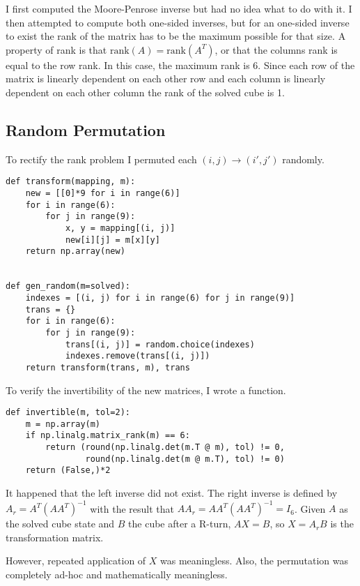 \documentclass[11pt, oneside]{article}
\begin{document}
I first computed the Moore-Penrose inverse but had no idea what to do with it.
I then attempted to compute both one-sided inverses, but for an one-sided inverse to exist the rank of the matrix has to be the maximum possible for that size.
A property of rank is that \( \text{rank}(A) = \text{rank}(A^T) \), or that the columns rank is equal to the row rank. In this case, the maximum rank is 6.
Since each row of the matrix is linearly dependent on each other row and each column is linearly dependent on each other column the rank of the solved cube is 1.

\subsection{Random Permutation}

To rectify the rank problem I permuted each \( (i, j) \to (i', j') \) randomly.

\begin{verbatim}
def transform(mapping, m):
    new = [[0]*9 for i in range(6)]
    for i in range(6):
        for j in range(9):
            x, y = mapping[(i, j)]
            new[i][j] = m[x][y]
    return np.array(new)


def gen_random(m=solved):
    indexes = [(i, j) for i in range(6) for j in range(9)]
    trans = {}
    for i in range(6):
        for j in range(9):
            trans[(i, j)] = random.choice(indexes)
            indexes.remove(trans[(i, j)])
    return transform(trans, m), trans
\end{verbatim}

To verify the invertibility of the new matrices, I wrote a function.

\begin{verbatim}
def invertible(m, tol=2):
    m = np.array(m)
    if np.linalg.matrix_rank(m) == 6:
        return (round(np.linalg.det(m.T @ m), tol) != 0,
                round(np.linalg.det(m @ m.T), tol) != 0)
    return (False,)*2
\end{verbatim}

It happened that the left inverse did not exist.
The right inverse is defined by \( A_r = A^T (A A^T)^{-1} \) with the result that
\( A A_r = A A^T (A A^T)^{-1} = I_6 \).
Given \( A \) as the solved cube state and \( B \) the cube after a R-turn,
\( A X = B \), so \( X = A_r B \) is the transformation matrix.

However, repeated application of \( X \) was meaningless. Also, the permutation
was completely ad-hoc and mathematically meaningless.
\end{document}
